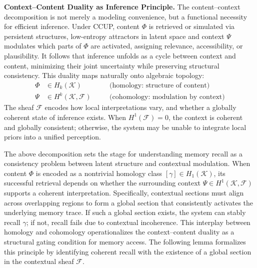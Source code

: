 \documentclass[lettersize,journal]{IEEEtran}
\begin{document}
\noindent\textbf{Context–Content Duality as Inference Principle.}
The content–context decomposition is not merely a modeling convenience, but a functional necessity for efficient inference. Under CCUP, content \( \Phi \) is retrieved or simulated via persistent structures, low-entropy attractors in latent space and context \( \Psi \) modulates which parts of \( \Phi \) are activated, assigning relevance, accessibility, or plausibility.
It follows that inference unfolds as a cycle between context and content, minimizing their joint uncertainty while preserving structural consistency.
This duality maps naturally onto algebraic topology:
\begin{align*}
    \Phi &\in H_k(\mathcal{K}) \quad &&\text{(homology: structure of content)} \\
    \Psi &\in H^k(\mathcal{K}, \mathcal{F}) \quad &&\text{(cohomology: modulation by context)}
\end{align*}
The sheaf \( \mathcal{F} \) encodes how local interpretations vary, and whether a globally coherent state of inference exists. When \( H^1(\mathcal{F}) = 0 \), the context is coherent and globally consistent; otherwise, the system may be unable to integrate local priors into a unified perception.


The above decomposition sets the stage for understanding memory recall as a consistency problem between latent structure and contextual modulation. When content \( \Phi \) is encoded as a nontrivial homology class \( [\gamma] \in H_1(\mathcal{K}) \), its successful retrieval depends on whether the surrounding context \( \Psi \in H^1(\mathcal{K}, \mathcal{F}) \) supports a coherent interpretation. Specifically, contextual sections must align across overlapping regions to form a global section that consistently activates the underlying memory trace. If such a global section exists, the system can stably recall \( \gamma \); if not, recall fails due to contextual incoherence. This interplay between homology and cohomology \cite{iversen2012cohomology} operationalizes the context–content duality as a structural gating condition for memory access. The following lemma formalizes this principle by identifying coherent recall with the existence of a global section in the contextual sheaf \( \mathcal{F} \).
\end{document}
